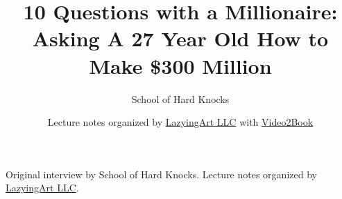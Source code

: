 \documentclass[11pt,oneside]{book}
\begin{document}
\frontmatter
\title{10 Questions with a Millionaire: Asking A 27 Year Old How to Make \$300 Million}
\author{School of Hard Knocks}
\date{Lecture notes organized by \href{https://lazying.art}{LazyingArt LLC} with \href{https://github.com/lachlanchen/Video2Book}{Video2Book}}
\maketitle
\begin{center}
\small Original interview by School of Hard Knocks. Lecture notes organized by \href{https://lazying.art}{LazyingArt LLC}.
\end{center}
\clearpage
\mainmatter

\end{document}
